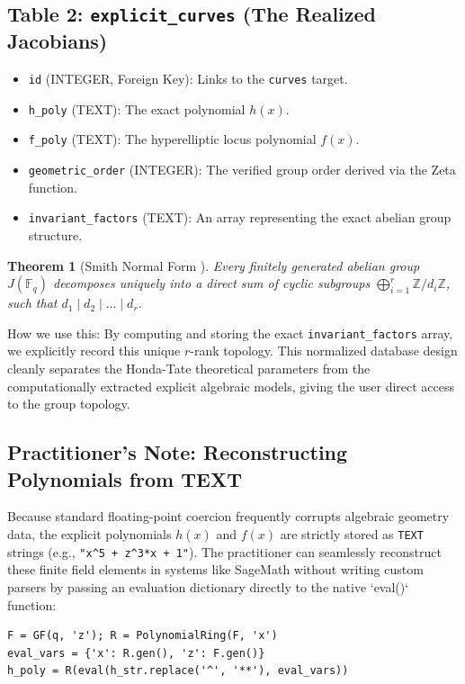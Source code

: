 \documentclass[letterpaper, 11pt]{article}
\newtheorem{theorem}{Theorem}[section]
\begin{document}
\subsection{Table 2: \texttt{explicit\_curves} (The Realized Jacobians)}
\begin{itemize}
    \item \texttt{id} (INTEGER, Foreign Key): Links to the \texttt{curves} target.
    \item \texttt{h\_poly} (TEXT): The exact polynomial $h(x)$.
    \item \texttt{f\_poly} (TEXT): The hyperelliptic locus polynomial $f(x)$.
    \item \texttt{geometric\_order} (INTEGER): The verified group order derived via the Zeta function.
    \item \texttt{invariant\_factors} (TEXT): An array representing the exact abelian group structure.
\end{itemize}

\begin{theorem}[Smith Normal Form \cite{Smith1861}]
Every finitely generated abelian group $J(\mathbb{F}_q)$ decomposes uniquely into a direct sum of cyclic subgroups $\bigoplus_{i=1}^r \mathbb{Z}/d_i\mathbb{Z}$, such that $d_1 \mid d_2 \mid \dots \mid d_r$.
\end{theorem}

How we use this: By computing and storing the exact \texttt{invariant\_factors} array, we explicitly record this unique $r$-rank topology. This normalized database design cleanly separates the Honda-Tate theoretical parameters from the computationally extracted explicit algebraic models, giving the user direct access to the group topology.

\subsection{Practitioner's Note: Reconstructing Polynomials from TEXT}
Because standard floating-point coercion frequently corrupts algebraic geometry data, the explicit polynomials $h(x)$ and $f(x)$ are strictly stored as \texttt{TEXT} strings (e.g., \texttt{"x\textasciicircum 5 + z\textasciicircum 3*x + 1"}). The practitioner can seamlessly reconstruct these finite field elements in systems like SageMath without writing custom parsers by passing an evaluation dictionary directly to the native `eval()` function:
\begin{verbatim}
F = GF(q, 'z'); R = PolynomialRing(F, 'x')
eval_vars = {'x': R.gen(), 'z': F.gen()}
h_poly = R(eval(h_str.replace('^', '**'), eval_vars))
\end{verbatim}
\end{document}
